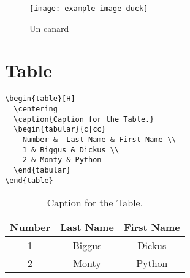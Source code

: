 \documentclass{article}
\begin{document}
\begin{multicols*}{3}
\begin{multicols*}{2}
\begin{figure}[H]
    \centering
    \texttt{[image: example-image-duck]}
    \caption[Canard]{Un canard}
    \label{fig:right-triangle}
\end{figure}

\end{multicols*}

\section*{Table}

\begin{multicols*}{2}


\begin{lstlisting}
\begin{table}[H]
  \centering
  \caption{Caption for the Table.}
  \begin{tabular}{c|cc}
    Number &  Last Name & First Name \\
    1 & Biggus & Dickus \\
    2 & Monty & Python
  \end{tabular}
\end{table}
\end{lstlisting}
\columnbreak
\begin{table}[H]
  \centering
  \caption{Caption for the Table.}
  \begin{tabular}{c|cc}
    \toprule
    Number &  Last Name & First Name \\ \midrule
    1 & Biggus & Dickus \\
    2 & Monty & Python \\ \bottomrule
  \end{tabular}
\end{table}

\end{multicols*}
\end{multicols*}
\end{document}
